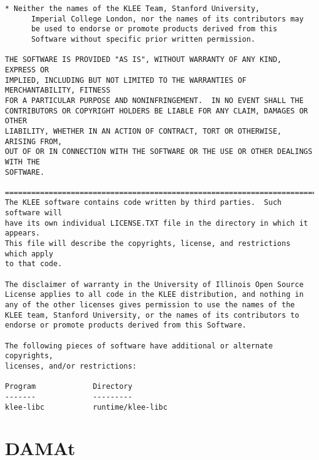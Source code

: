 \begin{lstlisting}[language={}]
    * Neither the names of the KLEE Team, Stanford University,
      Imperial College London, nor the names of its contributors may
      be used to endorse or promote products derived from this
      Software without specific prior written permission.

THE SOFTWARE IS PROVIDED "AS IS", WITHOUT WARRANTY OF ANY KIND, EXPRESS OR
IMPLIED, INCLUDING BUT NOT LIMITED TO THE WARRANTIES OF MERCHANTABILITY, FITNESS
FOR A PARTICULAR PURPOSE AND NONINFRINGEMENT.  IN NO EVENT SHALL THE
CONTRIBUTORS OR COPYRIGHT HOLDERS BE LIABLE FOR ANY CLAIM, DAMAGES OR OTHER
LIABILITY, WHETHER IN AN ACTION OF CONTRACT, TORT OR OTHERWISE, ARISING FROM,
OUT OF OR IN CONNECTION WITH THE SOFTWARE OR THE USE OR OTHER DEALINGS WITH THE
SOFTWARE.

==============================================================================
The KLEE software contains code written by third parties.  Such software will
have its own individual LICENSE.TXT file in the directory in which it appears.
This file will describe the copyrights, license, and restrictions which apply
to that code.

The disclaimer of warranty in the University of Illinois Open Source
License applies to all code in the KLEE distribution, and nothing in
any of the other licenses gives permission to use the names of the
KLEE team, Stanford University, or the names of its contributors to
endorse or promote products derived from this Software.

The following pieces of software have additional or alternate copyrights,
licenses, and/or restrictions:

Program             Directory
-------             ---------
klee-libc           runtime/klee-libc
\end{lstlisting}


\section{DAMAt}
